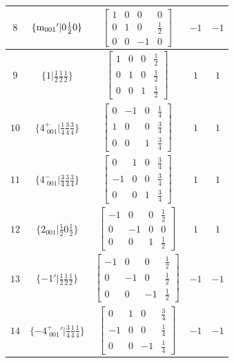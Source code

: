 \documentclass[fleqn,8pt]{jsarticle}
\begin{document}
\begin{longtable}{ccccc}
$ 8 $ & $ \{{\rm m}_{001}{}'|0 \frac{1}{2} 0\} $ & $ \begin{bmatrix} 1 & 0 & 0 & 0 \\ 0 & 1 & 0 & \frac{1}{2} \\ 0 & 0 & -1 & 0 \end{bmatrix} $ & $ -1 $ & $ -1 $ \\ \hline
$ 9 $ & $ \{1|\frac{1}{2} \frac{1}{2} \frac{1}{2}\} $ & $ \begin{bmatrix} 1 & 0 & 0 & \frac{1}{2} \\ 0 & 1 & 0 & \frac{1}{2} \\ 0 & 0 & 1 & \frac{1}{2} \end{bmatrix} $ & $ 1 $ & $ 1 $ \\ \hline
$ 10 $ & $ \{4^{+}_{\,\,001}|\frac{1}{4} \frac{3}{4} \frac{3}{4}\} $ & $ \begin{bmatrix} 0 & -1 & 0 & \frac{1}{4} \\ 1 & 0 & 0 & \frac{3}{4} \\ 0 & 0 & 1 & \frac{3}{4} \end{bmatrix} $ & $ 1 $ & $ 1 $ \\ \hline
$ 11 $ & $ \{4^{-}_{\,\,001}|\frac{3}{4} \frac{3}{4} \frac{3}{4}\} $ & $ \begin{bmatrix} 0 & 1 & 0 & \frac{3}{4} \\ -1 & 0 & 0 & \frac{3}{4} \\ 0 & 0 & 1 & \frac{3}{4} \end{bmatrix} $ & $ 1 $ & $ 1 $ \\ \hline
$ 12 $ & $ \{2{}_{001}|\frac{1}{2} 0 \frac{1}{2}\} $ & $ \begin{bmatrix} -1 & 0 & 0 & \frac{1}{2} \\ 0 & -1 & 0 & 0 \\ 0 & 0 & 1 & \frac{1}{2} \end{bmatrix} $ & $ 1 $ & $ 1 $ \\ \hline
$ 13 $ & $ \{-1{}'|\frac{1}{2} \frac{1}{2} \frac{1}{2}\} $ & $ \begin{bmatrix} -1 & 0 & 0 & \frac{1}{2} \\ 0 & -1 & 0 & \frac{1}{2} \\ 0 & 0 & -1 & \frac{1}{2} \end{bmatrix} $ & $ -1 $ & $ -1 $ \\ \hline
$ 14 $ & $ \{-4^{+}_{\,\,001}{}'|\frac{3}{4} \frac{1}{4} \frac{1}{4}\} $ & $ \begin{bmatrix} 0 & 1 & 0 & \frac{3}{4} \\ -1 & 0 & 0 & \frac{1}{4} \\ 0 & 0 & -1 & \frac{1}{4} \end{bmatrix} $ & $ -1 $ & $ -1 $ \\ \hline

\end{longtable}
\end{document}
